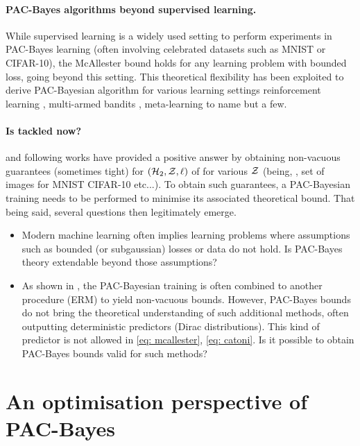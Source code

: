 \paragraph{PAC-Bayes algorithms beyond supervised learning.} While supervised learning is a widely used setting to perform experiments in PAC-Bayes learning (often involving celebrated datasets such as MNIST or CIFAR-10), the McAllester bound holds for any learning problem with bounded loss, going beyond this setting. This theoretical flexibility has been exploited to derive PAC-Bayesian algorithm for various learning settings reinforcement learning \citep{fard2010pac}, multi-armed bandits \citep{seldin2011pac,seldin2012pac,sakhi2023pac}, meta-learning \citep{amit2018meta,farid2021generalization,rothfuss2021pacoh,rothfuss2022pac,ding2021bridging} to name but a few. 
\\
\paragraph{Is  tackled now?}
\citep{dziugaite2017computing} and following works have provided a positive answer by obtaining non-vacuous guarantees (sometimes tight) for $(\mathcal{H}_2,\mathcal{Z},\ell)$ of  for various $\mathcal{Z}$ (being, \eg, set of images for MNIST CIFAR-10 etc...). To obtain such guarantees, a PAC-Bayesian training needs to be performed to minimise its associated theoretical bound. That being said, several questions then legitimately emerge.

\begin{itemize}
  \item Modern machine learning often implies learning problems where assumptions such as bounded (or subgaussian) losses or \iid data do not hold. Is PAC-Bayes theory extendable beyond those assumptions? 
  \item As shown in \citet{dziugaite2017computing}, the PAC-Bayesian training is often combined to another procedure (\eg ERM) to yield non-vacuous bounds. However, PAC-Bayes bounds do not bring the theoretical understanding of such additional methods, often outputting deterministic predictors (\ie Dirac distributions). This kind of predictor is not allowed in \eqref{eq: mcallester}, \eqref{eq: catoni}. Is it possible to obtain PAC-Bayes bounds valid for such methods? 
\end{itemize}



\section{An optimisation perspective of PAC-Bayes}

